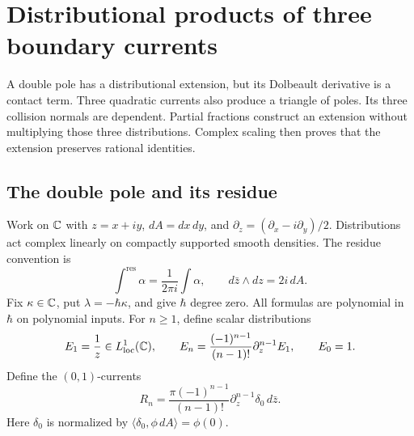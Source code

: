 \chapter{Distributional products of three boundary currents}
\label{chap:collision-distributions}

A double pole has a distributional extension, but its Dolbeault derivative
is a contact term.  Three quadratic currents also produce a triangle of
poles.  Its three collision normals are dependent.  Partial fractions
construct an extension without multiplying those three distributions.
Complex scaling then proves that the extension preserves rational identities.

\section{The double pole and its residue}

Work on $\mathbb C$ with $z=x+iy$, $dA=dx\,dy$, and
$\partial_z=(\partial_x-i\partial_y)/2$.
Distributions act complex linearly on compactly supported smooth densities.
The residue convention is
\[
 \int^{\mathrm{res}}\alpha=\frac1{2\pi i}\int\alpha,
 \qquad d\bar z\wedge dz=2i\,dA.
\]
Fix $\kappa\in\mathbb C$, put $\lambda=-\hbar\kappa$, and give
$\hbar$ degree zero.  All formulas are polynomial in $\hbar$ on polynomial
inputs.  For $n\ge1$, define scalar distributions
\begin{equation}
 \label{eq:cd-poles}
 E_1=\frac1z\in L^1_{\mathrm{loc}}(\mathbb C),\qquad
 E_n=\frac{(-1)^{n-1}}{(n-1)!}\partial_z^{n-1}E_1,
 \qquad E_0=1.
\end{equation}
Define the $(0,1)$-currents
\[
 R_n=\frac{\pi(-1)^{n-1}}{(n-1)!}
       \partial_z^{n-1}\delta_0\,d\bar z.
\]
Here $\delta_0$ is normalized by $\langle\delta_0,\phi\,dA\rangle=\phi(0)$.

